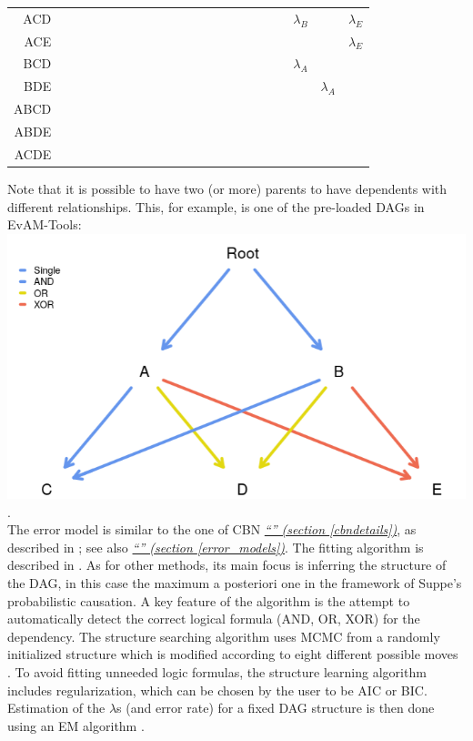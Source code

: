 \documentclass[a4paper,11pt]{article}
\newcommand*{\qref}[1]{\hyperref[{#1}]{\textit{``\nameref*{#1}'' (section \ref*{#1})}}}
\begin{document}
\begin{landscape}
\begin{table}[ht]
\begin{tabular}{rlllllllllllllllllllll}
  ACD &  &  &  &  &  &  &  &  &  &  &  &  &  &  &  &  &  &  & $\lambda_B$ &  & $\lambda_E$ \\ 
  ACE &  &  &  &  &  &  &  &  &  &  &  &  &  &  &  &  &  &  &  &  & $\lambda_E$ \\ 
  BCD &  &  &  &  &  &  &  &  &  &  &  &  &  &  &  &  &  &  & $\lambda_A$ &  &  \\ 
  BDE &  &  &  &  &  &  &  &  &  &  &  &  &  &  &  &  &  &  &  & $\lambda_A$ &  \\ 
  ABCD &  &  &  &  &  &  &  &  &  &  &  &  &  &  &  &  &  &  &  &  &  \\ 
  ABDE &  &  &  &  &  &  &  &  &  &  &  &  &  &  &  &  &  &  &  &  &  \\ 
  ACDE &  &  &  &  &  &  &  &  &  &  &  &  &  &  &  &  &  &  &  &  &  \\ 
   \hline
\end{tabular}
\end{table}
 \end{landscape}


Note that it is possible to have two (or more) parents to have dependents with different relationships. This, for example, is one of the pre-loaded DAGs in EvAM-Tools:\\

\includegraphics[width=.60\linewidth]{./dag-h-2.png}.\\


The error model is similar to the one of CBN \qref{cbndetails}, as described in \citet{gerstung2009quantifying,Sakoparnig2012}; see also \qref{error_models}. The fitting algorithm is described in \citet[Sections 2.1, 2.2, pp.~756 and 757]{angaroni2021}. As for other methods, its main focus is inferring the structure of the DAG, in this case the maximum a posteriori one in the framework of Suppe's probabilistic causation. A key feature of the algorithm is the attempt to automatically detect the correct logical formula (AND, OR, XOR) for the dependency. The structure searching algorithm uses MCMC from a randomly initialized structure which is modified according to eight different possible moves \citep[p.~756]{angaroni2021}. To avoid fitting unneeded logic formulas, the structure learning algorithm includes regularization, which can be chosen by the user to be AIC or BIC. Estimation of the $\lambda$s (and error rate) for a fixed DAG structure is then done using an EM algorithm \citep[p.757]{angaroni2021}. 
\end{document}

